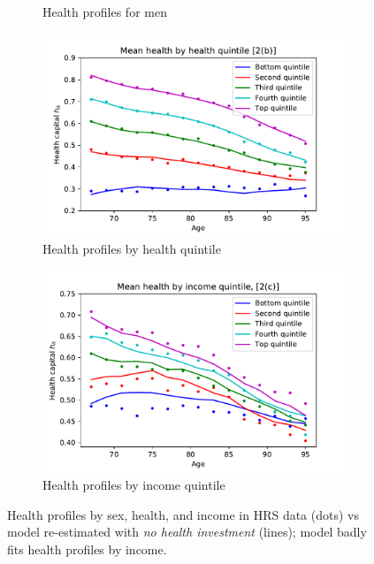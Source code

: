\documentclass[12pt,pdftex,letterpaper]{article}
\begin{document}
\begin{figure}[h!]
\begin{subfigure}[b]{0.49\textwidth}
        \caption{Health profiles for men}
    \end{subfigure}
    \begin{subfigure}[b]{0.49\textwidth}
        \centering
        \includegraphics[width=\textwidth]{../Figures/HealthByHealthAgeNoInvst.pdf}
        \caption{Health profiles by health quintile}
    \end{subfigure}
    \begin{subfigure}[b]{0.49\textwidth}
		\centering
		\includegraphics[width=\textwidth]{../Figures/HealthByIncAgeNoInvst.pdf}
		\caption{Health profiles by income quintile}
	\end{subfigure}
    \caption{Health profiles by sex, health, and income in HRS data (dots) vs model re-estimated with \textit{no health investment} (lines); model badly fits health profiles by income.}
    \label{fig:MomentCat2NoInvst}
\end{figure}
\end{document}
